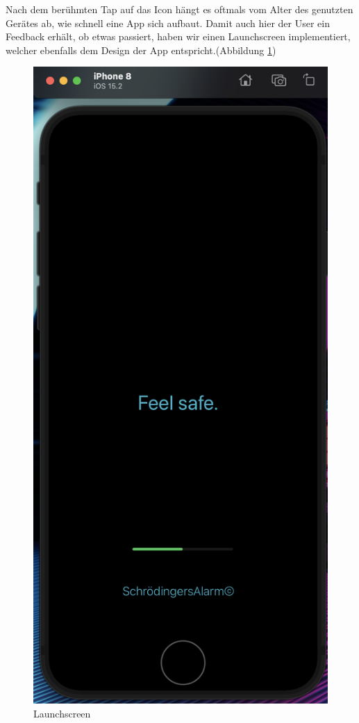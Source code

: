 Nach dem berühmten Tap auf das Icon hängt es oftmals vom Alter des genutzten Gerätes ab, wie schnell eine App sich aufbaut. Damit auch hier der User ein Feedback erhält, ob  etwas passiert, haben wir einen Launchscreen implementiert, welcher ebenfalls dem Design der App entspricht.(Abbildung \ref{Launch})
\begin{figure} [H]
	\begin{center}
		\includegraphics[width=1\textwidth]{Bilder/iOS_launch.png}
		\caption{Launchscreen}
		\label{Launch}
	\end{center}
\end{figure}
